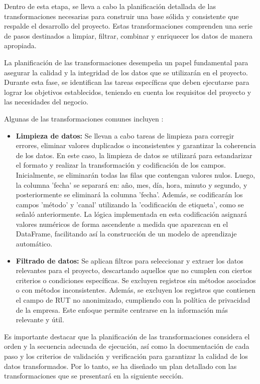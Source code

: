 Dentro de esta etapa, se lleva a cabo la planificación detallada de las transformaciones necesarias para construir una base sólida y consistente que respalde el desarrollo del proyecto. Estas transformaciones comprenden una serie de pasos destinados a limpiar, filtrar, combinar y enriquecer los datos de manera apropiada.

La planificación de las transformaciones desempeña un papel fundamental para asegurar la calidad y la integridad de los datos que se utilizarán en el proyecto. Durante esta fase, se identifican las tareas específicas que deben ejecutarse para lograr los objetivos establecidos, teniendo en cuenta los requisitos del proyecto y las necesidades del negocio.

Algunas de las transformaciones comunes incluyen \cite{etl-toolkit}:

\begin{itemize}
    \item \textbf{Limpieza de datos:} Se llevan a cabo tareas de limpieza para corregir errores, eliminar valores duplicados o inconsistentes y garantizar la coherencia de los datos. En este caso, la limpieza de datos se utilizará para estandarizar el formato y realizar la transformación y codificación de los campos. Inicialmente, se eliminarán todas las filas que contengan valores nulos. Luego, la columna 'fecha' se separará en: año, mes, día, hora, minuto y segundo, y posteriormente se eliminará la columna 'fecha'. Además, se codificarán los campos 'método' y 'canal' utilizando la 'codificación de etiqueta', como se señaló anteriormente. La lógica implementada en esta codificación asignará valores numéricos de forma ascendente a medida que aparezcan en el DataFrame, facilitando así la construcción de un modelo de aprendizaje automático.

    \item \textbf{Filtrado de datos:} Se aplican filtros para seleccionar y extraer los datos relevantes para el proyecto, descartando aquellos que no cumplen con ciertos criterios o condiciones específicas. Se excluyen registros sin métodos asociados o con métodos inconsistentes. Además, se excluyen los registros que contienen el campo de RUT no anonimizado, cumpliendo con la política de privacidad de la empresa. Este enfoque permite centrarse en la información más relevante y útil.
\end{itemize}

Es importante destacar que la planificación de las transformaciones considera el orden y la secuencia adecuada de ejecución, así como la documentación de cada paso y los criterios de validación y verificación para garantizar la calidad de los datos transformados. Por lo tanto, se ha diseñado un plan detallado con las transformaciones que se presentará en la siguiente sección.